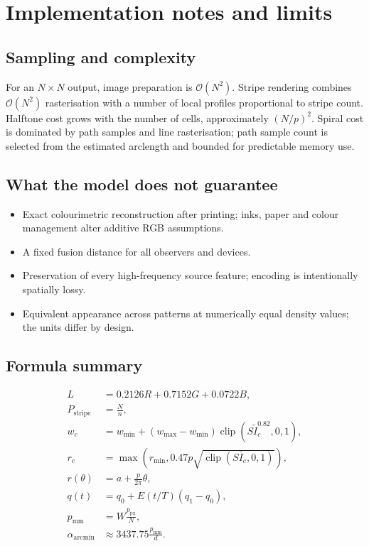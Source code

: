 \documentclass[10.5pt,a4paper]{article}
\newcommand{\clip}{\operatorname{clip}}
\begin{document}
\section{Implementation notes and limits}
\subsection{Sampling and complexity}
For an $N\times N$ output, image preparation is $\mathcal{O}(N^2)$. Stripe rendering combines $\mathcal{O}(N^2)$ rasterisation with a number of local profiles proportional to stripe count. Halftone cost grows with the number of cells, approximately $(N/p)^2$. Spiral cost is dominated by path samples and line rasterisation; path sample count is selected from the estimated arclength and bounded for predictable memory use.

\subsection{What the model does not guarantee}
\begin{itemize}
\item Exact colourimetric reconstruction after printing; inks, paper and colour management alter additive RGB assumptions.
\item A fixed fusion distance for all observers and devices.
\item Preservation of every high-frequency source feature; encoding is intentionally spatially lossy.
\item Equivalent appearance across patterns at numerically equal density values; the units differ by design.
\end{itemize}

\subsection{Formula summary}
\begin{align}
L &=0.2126R+0.7152G+0.0722B,\\[3pt]
P_{\mathrm{stripe}}&=\frac{N}{n},\\[3pt]
w_c&=w_{\min}+(w_{\max}-w_{\min})\clip(S\widetilde I_c^{0.82},0,1),\\[3pt]
r_c&=\max\!\left(r_{\min},0.47p\sqrt{\clip(S\bar I_c,0,1)}\right),\\[3pt]
r(\theta)&=a+\frac{p}{2\pi}\theta,\\[3pt]
q(t)&=q_0+E(t/T)(q_1-q_0),\\[3pt]
p_{\mathrm{mm}}&=W\frac{p_{\mathrm{px}}}{N},\\[3pt]
\alpha_{\mathrm{arcmin}}&\approx3437.75\frac{p_{\mathrm{mm}}}{d}.
\end{align}
\end{document}
